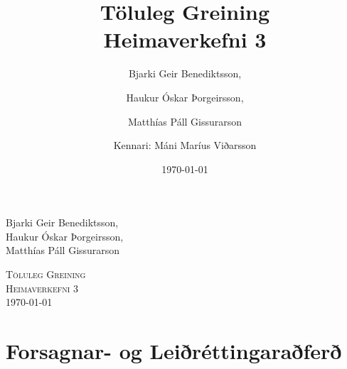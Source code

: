 \documentclass[a4]{article}
\title{Töluleg Greining\\ Heimaverkefni 3}
\date{\today{}}
\author{ 
  Bjarki Geir Benediktsson,\and
  Haukur Óskar Þorgeirsson,\and
  Matthías Páll Gissurarson \and
  Kennari: Máni Maríus Viðarsson
  }
\begin{document}
\begin{flushright}
  Bjarki Geir Benediktsson,\\
  Haukur Óskar Þorgeirsson,\\
  Matthías Páll Gissurarson\\
\end{flushright}

\begin{center}
 \textsc{ \LARGE Töluleg Greining\\
  Heimaverkefni 3\\
  \today{}
  }
  \end{center}
\vfill

\maketitle
\section{Forsagnar- og Leiðréttingaraðferð}
\subsection{}

\end{document}
